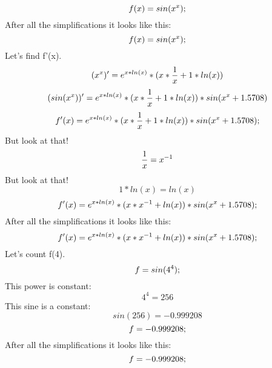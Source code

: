 \documentclass[12pt]{article}
\begin{document}
\begin{equation}
\large f(x)={sin({{x}^{x}})};
\end{equation}
After all the simplifications it looks like this:
\begin{equation}
\large f(x)={sin({{x}^{x}})};
\end{equation}
\begin{equation}
\end{equation}
Let's find f'(x). \begin{equation}
({{x}^{x}})'={{{e}^{{x}*{ln({x})}}}*({{{x}*{{1}\over{x}}}+{{1}*{ln({x})}}})}\end{equation}\begin{equation}
({sin({{x}^{x}})})'={{{{e}^{{x}*{ln({x})}}}*({{{x}*{{1}\over{x}}}+{{1}*{ln({x})}}})}*{sin({{{x}^{x}}+{1.5708}})}}\end{equation}\begin{equation}
\large f'(x)={{{{e}^{{x}*{ln({x})}}}*({{{x}*{{1}\over{x}}}+{{1}*{ln({x})}}})}*{sin({{{x}^{x}}+{1.5708}})}};
\end{equation}
But look at that!
\begin{equation}
{{1}\over{x}}={{x}^{-1}}
\end{equation}
But look at that!
\begin{equation}
{{1}*{ln({x})}}={ln({x})}
\end{equation}
\begin{equation}
\large f'(x)={{{{e}^{{x}*{ln({x})}}}*({{{x}*{{x}^{-1}}}+{ln({x})}})}*{sin({{{x}^{x}}+{1.5708}})}};
\end{equation}
After all the simplifications it looks like this:
\begin{equation}
\large f'(x)={{{{e}^{{x}*{ln({x})}}}*({{{x}*{{x}^{-1}}}+{ln({x})}})}*{sin({{{x}^{x}}+{1.5708}})}};
\end{equation}
Let's count f(4). \begin{equation}
\large f={sin({{4}^{4}})};
\end{equation}
This power is constant:
\begin{equation}
{{4}^{4}}={256}
\end{equation}
This sine is a constant:
\begin{equation}
{sin({256})}={-0.999208}
\end{equation}
\begin{equation}
\large f={-0.999208};
\end{equation}
After all the simplifications it looks like this:
\begin{equation}
\large f={-0.999208};
\end{equation}
\end{document}
